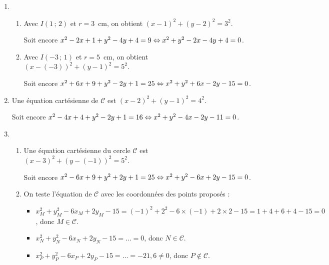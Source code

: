 \documentclass[a4paper,11pt]{article}
\begin{document}
\medskip


\begin{enumerate}
	\item 
	\begin{enumerate}
		\item Avec $I(1\,;\,2)$ et $r=3$~cm, on obtient $(x-1)^2+(y-2)^2=3^2$.
		
		Soit encore $x^2-2x+1+y^2-4y+4=9 \Leftrightarrow x^2 + y^2 - 2x - 4y + 4 = 0$.
		\item Avec $I(-3\,;\,1)$ et $r=5$~cm, on obtient $(x-(-3))^2+(y-1)^2=5^2$.
		
		Soit encore $x^2+6x+9+y^2-2y+1=25 \Leftrightarrow x^2+y^2+6x-2y-15=0$.
	\end{enumerate}
	\item Une équation cartésienne de $\mathscr{C}$ est $(x-2)^2+(y-1)^2=4^2$.
	
	Soit encore $x^2-4x+4+y^2-2y+1=16 \Leftrightarrow x^2+y^2-4x-2y-11=0$.
	\item 
	\begin{enumerate}
		\item Une équation cartésienne du cercle $\mathscr{C}$ est $(x-3)^2+(y-(-1))^2=5^2$.
		
		Soit encore $x^2-6x+9+y^2+2y+1=25 \Leftrightarrow x^2+y^2-6x+2y-15=0$.
		\item On teste l'équation de $\mathscr{C}$ avec les coordonnées des points proposés :
		
		\begin{itemize}
			\item $x_M^2+y_M^2-6x_M+2y_M-15=(-1)^2 + 2^2 − 6\times(-1) + 2\times2 - 15 = 1 + 4 + 6 + 4 - 15 = 0$, donc $M \in \mathscr{C}$.
		
			\item $x_N^2 + y_N^2 - 6x_N + 2y_N - 15 = \ldots = 0$, donc $N  \in \mathscr{C}$.
			\item $x_P^2 + y_P^2 - 6x_P + 2y_P - 15 = \ldots = -21,6 \neq 0$, donc $P \not\in \mathscr{C}$.
		\end{itemize}
	\end{enumerate}
\end{enumerate}

\pagebreak

\end{document}
